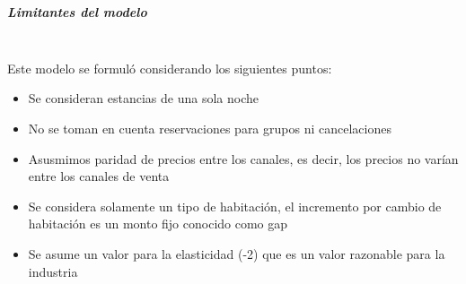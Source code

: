 \documentclass{article}\usepackage[]{graphicx}\usepackage[]{color}
\begin{document}
~\\
\subparagraph{Limitantes del modelo}~\\
Este modelo se formuló considerando los siguientes puntos:
\begin{itemize}[noitemsep]
  \item Se consideran estancias de una sola noche
  \item No se toman en cuenta reservaciones para grupos ni cancelaciones
  \item Asusmimos paridad de precios entre los canales, es decir, los precios no varían entre los canales de venta
  \item Se considera solamente un tipo de habitación, el incremento por cambio de habitación es un monto fijo conocido como gap
  \item Se asume un valor para la elasticidad (-2) que es un valor razonable para la industria
\end{itemize}
\end{document}
